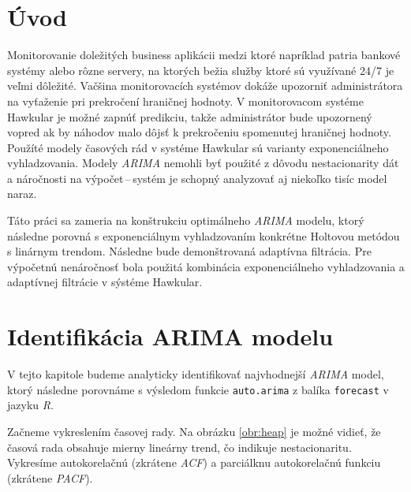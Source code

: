 \documentclass[12pt,a4paper,oneside,final]{article}
\theoremstyle{definition}
\theoremstyle{remark}
\numberwithin{equation}{section}
\begin{document}
\VytvorTitulniStranu

\section{Úvod}
Monitorovanie doležitých business aplikácii medzi ktoré napríklad patria bankové systémy alebo rôzne
servery, na ktorých bežia služby ktoré sú využívané 24/7 je veľmi dôležité. Vačšina
monitorovacích systémov dokáže upozorniť administrátora na vyťaženie pri prekročení
hraničnej hodnoty. V monitorovacom systéme Hawkular je možné zapnúť predikciu, takže
administrátor bude upozornený vopred ak by náhodov malo dôjsť k prekročeniu spomenutej
hraničnej hodnoty. Použíté modely časových rád v systéme Hawkular sú varianty
exponenciálneho vyhladzovania. Modely \emph{ARIMA} nemohli byť použité z dôvodu nestacionarity dát 
a náročnosti na výpočet\,--\,systém je schopný analyzovať aj niekoľko tisíc model naraz. 

Táto práci sa zameria na konštrukciu optimálneho \emph{ARIMA} modelu, ktorý následne porovná
s exponenciálnym vyhladzovaním konkrétne Holtovou metódou s linárnym trendom. Následne
bude demonštrovaná adaptívna filtrácia. Pre výpočetnú nenáročnosť  bola použitá 
kombinácia exponenciálneho vyhladzovania a
adaptívnej filtrácie v sýstéme Hawkular.


\section{Identifikácia ARIMA modelu}
V tejto kapitole budeme analyticky identifikovať najvhodnejší \emph{ARIMA} model, ktorý následne 
porovnáme s výsledom funkcie \texttt{auto.arima} z balíka \texttt{forecast} v jazyku
\emph{R}.

Začneme vykreslením časovej rady. Na obrázku \ref{obr:heap} je možné vidieť, že časová rada 
obsahuje mierny lineárny trend, čo indikuje nestacionaritu. Vykresíme autokorelačnú 
(zkrátene \emph{ACF}) a parciálknu autokorelačnú funkciu (zkrátene \emph{PACF}).
\end{document}
